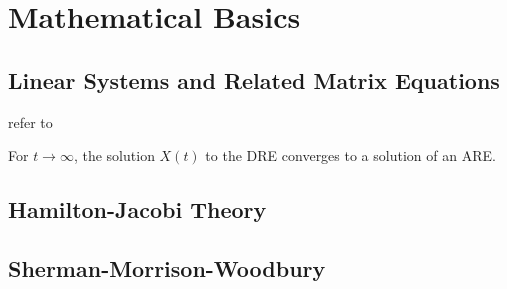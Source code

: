\chapter{Mathematical Basics}
\section{Linear Systems and Related Matrix Equations}

refer to \cite{Simoncini2016}

\begin{proposition}
\label{thm:basics:dre-limit-are}
  For $t\to\infty$, the solution $X(t)$ to the \ac{DRE} converges to a solution of an \ac{ARE}.
\end{proposition}

\section{Hamilton-Jacobi Theory}
\section{Sherman-Morrison-Woodbury}

